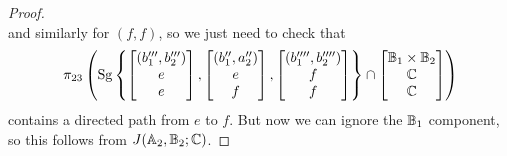 \documentclass[letterpaper,11pt]{article}
\DeclareMathOperator{\Sg}{Sg}
\begin{document}
\begin{proof}
\[\]
and similarly for $(f,f)$, so we just need to check that
\[
\pi_{23}\left(\Sg\left\{\begin{bmatrix}(b_1''',b_2''')\\ e\\ e\end{bmatrix},\begin{bmatrix}(b_1'',a_2'')\\ e\\ f\end{bmatrix}, \begin{bmatrix}(b_1'''',b_2'''')\\ f\\ f\end{bmatrix}\right\} \cap \begin{bmatrix}\bB_1\times \bB_2\\ \bC\\ \bC \end{bmatrix}\right)
\]
contains a directed path from $e$ to $f$. But now we can ignore the $\mathbb{B}_1$ component, so this follows from $J(\mathbb{A}_2,\mathbb{B}_2;\mathbb{C})$.
\end{proof}
\end{document}
